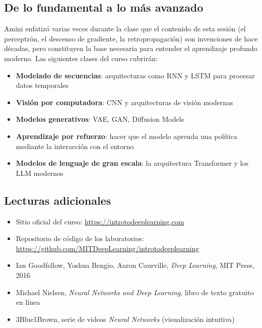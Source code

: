 \documentclass[a4paper]{article}
\begin{document}
\subsection{De lo fundamental a lo más avanzado}

Amini enfatizó varias veces durante la clase que el contenido de esta sesión (el perceptrón, el descenso de gradiente, la retropropagación) son invenciones de hace décadas, pero constituyen la base necesaria para entender el aprendizaje profundo moderno. Las siguientes clases del curso cubrirán:

\begin{itemize}
\item \textbf{Modelado de secuencias}: arquitecturas como RNN y LSTM para procesar datos temporales
\item \textbf{Visión por computadora}: CNN y arquitecturas de visión modernas
\item \textbf{Modelos generativos}: VAE, GAN, Diffusion Models
\item \textbf{Aprendizaje por refuerzo}: hacer que el modelo aprenda una política mediante la interacción con el entorno
\item \textbf{Modelos de lenguaje de gran escala}: la arquitectura Transformer y los LLM modernos
\end{itemize}

\subsection{Lecturas adicionales}

\begin{itemize}
\item Sitio oficial del curso: \url{https://introtodeeplearning.com}
\item Repositorio de código de los laboratorios: \url{https://github.com/MITDeepLearning/introtodeeplearning}
\item Ian Goodfellow, Yoshua Bengio, Aaron Courville, \textit{Deep Learning}, MIT Press, 2016
\item Michael Nielsen, \textit{Neural Networks and Deep Learning}, libro de texto gratuito en línea
\item 3Blue1Brown, serie de videos \textit{Neural Networks} (visualización intuitiva)
\end{itemize}

\end{document}
